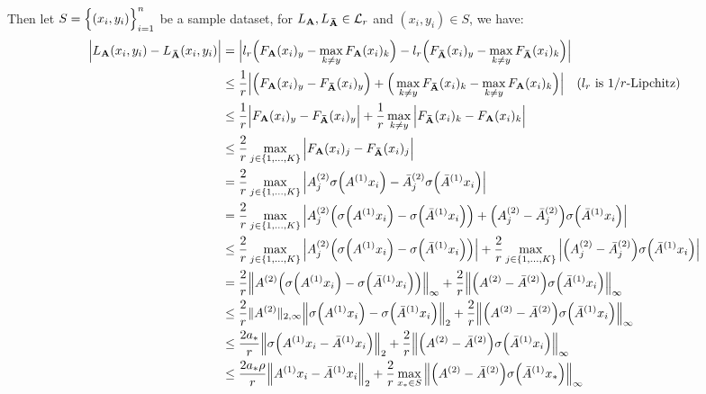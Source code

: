 \noindent Then let $S=\Big\{ (x_i, y_i) \Big\}_{i=1}^n$ be a sample dataset, for $L_{\bf A}, L_{\bf \bar A}\in\mathcal{L}_r$ and $(x_i, y_i)\in S$, we have:
\begin{align*}
    \Big| L_{\bf A}(x_i, y_i) - L_{\bf \bar A}(x_i, y_i) \Big| &= \Big| 
        l_r\Big( 
            F_{\bf A}(x_i)_y - \max_{k\ne y} F_{\bf A}(x_i)_k
         \Big) - 
        l_r\Big( 
            F_{\bf \bar A}(x_i)_y - \max_{k\ne y} F_{\bf \bar A}(x_i)_k
         \Big)
     \Big| \\
    &\le \frac{1}{r} \Big| 
        \Big( F_{\bf A}(x_i)_y - F_{\bf \bar A}(x_i)_y \Big) +
        \Big( 
            \max_{k\ne y} F_{\bf \bar A}(x_i)_k - \max_{k\ne y} F_{\bf A}(x_i)_k
         \Big)
     \Big| \ \ \ \text{($l_r$ is $1/r$-Lipchitz)} \\
    &\le \frac{1}{r} \Big| 
        F_{\bf A}(x_i)_y - F_{\bf \bar A}(x_i)_y
     \Big| + \frac{1}{r}\max_{k\ne y}\Big| 
        F_{\bf \bar A}(x_i)_k - F_{\bf A}(x_i)_k
     \Big| \\
    &\le \frac{2}{r}\max_{j\in\{1, \dots, K\}} \Big| F_{\bf A}(x_i)_j - F_{\bf \bar A}(x_i)_j \Big| \\
    &= \frac{2}{r}\max_{j\in\{1, \dots, K\}} \Big| 
        A^{(2)}_j\sigma\Big( A^{(1)}x_i \Big) - \bar A^{(2)}_j\sigma\Big( \bar A^{(1)}x_i \Big)
     \Big| \\
    &= \frac{2}{r}\max_{j\in\{1, \dots, K\}} \Big| 
        A_j^{(2)}\Big( \sigma\Big( A^{(1)}x_i \Big) - \sigma\Big( \bar A^{(1)}x_i \Big) \Big)
        + \Big( A_j^{(2)} - \bar A_j^{(2)} \Big)\sigma\Big( \bar A^{(1)}x_i \Big) 
     \Big| \\
    &\le \frac{2}{r}\max_{j\in\{1, \dots, K\}}\Big| 
        A_j^{(2)}\Big( \sigma\Big( A^{(1)}x_i \Big) - \sigma\Big( \bar A^{(1)}x_i \Big) \Big)
     \Big| + \frac{2}{r}\max_{j\in\{1, \dots, K\}}\Big| 
        \Big( A_j^{(2)} - \bar A_j^{(2)} \Big)\sigma\Big( \bar A^{(1)}x_i \Big) 
     \Big| \\
    &= \frac{2}{r}\Big\| 
        A^{(2)}\Big( \sigma\Big( A^{(1)}x_i \Big) - \sigma\Big( \bar A^{(1)}x_i \Big) \Big)
    \Big\|_\infty + 
    \frac{2}{r}\Big\|
        \Big( A^{(2)} - \bar A^{(2)} \Big)\sigma\Big( \bar A^{(1)}x_i \Big) 
    \Big\|_\infty \\
    &\le \frac{2}{r} \|A^{(2)}\|_{2,\infty} \Big\| \sigma\Big( A^{(1)}x_i \Big) - \sigma\Big( \bar A^{(1)}x_i \Big) \Big\|_2  + \frac{2}{r} \Big\| \Big( A^{(2)} - \bar A^{(2)} \Big)\sigma\Big( \bar A^{(1)}x_i \Big) \Big\|_\infty \\
    &\le \frac{2a_*}{r} \Big\| \sigma\Big( A^{(1)}x_i - \bar A^{(1)}x_i \Big)\Big\|_2 + \frac{2}{r} \Big\| \Big( A^{(2)} - \bar A^{(2)} \Big)\sigma\Big( \bar A^{(1)}x_i \Big) \Big\|_\infty \\
    &\le \frac{2a_*\rho}{r} \Big\| A^{(1)}x_i - \bar A^{(1)}x_i \Big\|_2 + \frac{2}{r} \max_{x_* \in S}\Big\| \Big( A^{(2)} - \bar A^{(2)} \Big)\sigma\Big( \bar A^{(1)}x_* \Big) \Big\|_\infty \\
\end{align*}

